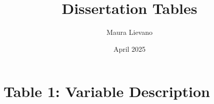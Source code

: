 \documentclass{article}
\title{Dissertation Tables}
\author{Maura Lievano}
\date{April 2025}
\begin{document}
\maketitle

\section*{Table 1: Variable Description}


\clearpage

%

% 
\end{document}
